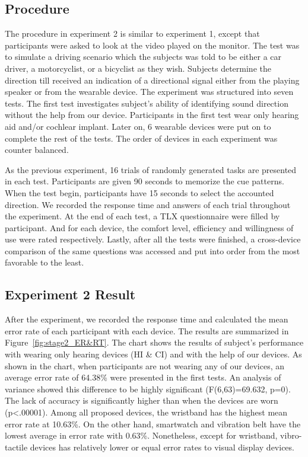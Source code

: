 \documentclass{sigchi}
\begin{document}
\subsection{Procedure}
The procedure in experiment 2 is similar to experiment 1, except that participants were asked to look at the video played on the monitor. The test was to simulate a driving scenario which the subjects was told to be either a car driver, a motorcyclist, or a bicyclist as they wish. Subjects determine the direction till received an indication of a directional signal either from the playing speaker or from the wearable device. The experiment was structured into seven tests. The first test investigates subject's ability of identifying sound direction without the help from our device. Participants in the first test wear only hearing aid and/or cochlear implant. Later on, 6 wearable devices were put on to complete the rest of the tests. The order of devices in each experiment was counter balanced.

As the previous experiment, 16 trials of randomly generated tasks are presented in each test. Participants are given 90 seconds to memorize the cue patterns. When the test begin, participants have 15 seconds to select the accounted direction. We recorded the response time and answers of each trial throughout the experiment. At the end of each test, a TLX questionnaire were filled by participant. And for each device, the comfort level, efficiency and willingness of use were rated respectively. Lastly, after all the tests were finished, a cross-device comparison of the same questions was accessed and put into order from the most favorable to the least.

\subsection{Experiment 2 Result}
After the experiment, we recorded the response time and calculated the mean error rate of each participant with each device. The results are summarized in Figure~\ref{fig:stage2_ER&RT}. The chart shows the results of subject's performance with wearing only hearing devices (HI \& CI) and with the help of our devices. As shown in the chart, when participants are not wearing any of our devices, an average error rate of 64.38\% were presented in the first tests. An analysis of variance showed this difference to be highly significant (F(6,63)=69.632, p=0). The lack of accuracy is significantly higher than when the devices are worn (p\textless.00001). Among all proposed devices, the wristband has the highest mean error rate at 10.63\%. On the other hand, smartwatch and vibration belt have the lowest average in error rate with 0.63\%. Nonetheless, except for wristband, vibro-tactile devices has relatively lower or equal error rates to visual display devices.
\end{document}
